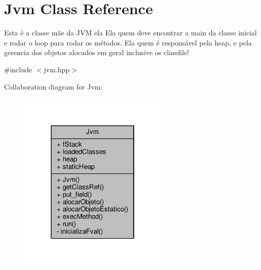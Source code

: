 \hypertarget{classJvm}{\section{Jvm Class Reference}
\label{classJvm}
}


Esta é a classe mãe da J\+V\+M ela Ela quem deve encontrar a main da classe inicial e rodar o loop para rodar os métodos. Ela quem é responsável pela heap, e pela gerencia dos objetos alocados em geral inclusive os classfile!  




{\ttfamily \#include $<$jvm.\+hpp$>$}



Collaboration diagram for Jvm\+:\nopagebreak
\begin{figure}[H]
\begin{center}
\leavevmode
\includegraphics[width=202pt]{classJvm__coll__graph}
\end{center}
\end{figure}
